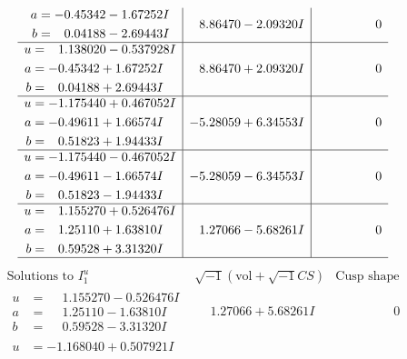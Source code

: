 \documentclass[1p]{elsarticle_modified}
\theoremstyle{definition}
\newcommand{\I}{\sqrt{-1}}
\begin{document}
$$\begin{array}{c|c|c}
\begin{aligned}
a &= -0.45342 - 1.67252 I \\
b &= \phantom{-}0.04188 - 2.69443 I\end{aligned}
 & \phantom{-}8.86470 - 2.09320 I & \phantom{-0.000000 } 0 \\ \hline\begin{aligned}
u &= \phantom{-}1.138020 - 0.537928 I \\
a &= -0.45342 + 1.67252 I \\
b &= \phantom{-}0.04188 + 2.69443 I\end{aligned}
 & \phantom{-}8.86470 + 2.09320 I & \phantom{-0.000000 } 0 \\ \hline\begin{aligned}
u &= -1.175440 + 0.467052 I \\
a &= -0.49611 + 1.66574 I \\
b &= \phantom{-}0.51823 + 1.94433 I\end{aligned}
 & -5.28059 + 6.34553 I & \phantom{-0.000000 } 0 \\ \hline\begin{aligned}
u &= -1.175440 - 0.467052 I \\
a &= -0.49611 - 1.66574 I \\
b &= \phantom{-}0.51823 - 1.94433 I\end{aligned}
 & -5.28059 - 6.34553 I & \phantom{-0.000000 } 0 \\ \hline\begin{aligned}
u &= \phantom{-}1.155270 + 0.526476 I \\
a &= \phantom{-}1.25110 + 1.63810 I \\
b &= \phantom{-}0.59528 + 3.31320 I\end{aligned}
 & \phantom{-}1.27066 - 5.68261 I & \phantom{-0.000000 } 0\\
 \hline 
 \end{array}$$\newpage$$\begin{array}{c|c|c}  
\text{Solutions to }I^u_{1}& \I (\text{vol} + \sqrt{-1}CS) & \text{Cusp shape}\\
 \hline 
\begin{aligned}
u &= \phantom{-}1.155270 - 0.526476 I \\
a &= \phantom{-}1.25110 - 1.63810 I \\
b &= \phantom{-}0.59528 - 3.31320 I\end{aligned}
 & \phantom{-}1.27066 + 5.68261 I & \phantom{-0.000000 } 0 \\ \hline\begin{aligned}
u &= -1.168040 + 0.507921 I \\

\end{aligned}
\end{array}$$
\end{document}
